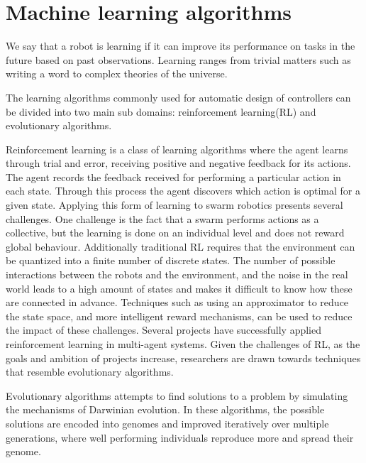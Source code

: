 \section{Machine learning algorithms}
\label{sec:learning}
We say that a robot is learning if it can improve its performance on tasks in the future based on past observations.
Learning ranges from trivial matters such as writing a word to complex theories of the universe.

The learning algorithms commonly used for automatic design of controllers can be divided into two main sub domains: reinforcement learning(RL) and evolutionary algorithms\cite{brambilla_swarm_2013}.

Reinforcement learning is a class of learning algorithms where the agent learns through trial and error, receiving positive and negative feedback for its actions\cite{brambilla_swarm_2013}.
The agent records the feedback received for performing a particular action in each state.
Through this process the agent discovers which action is optimal for a given state.
Applying this form of learning to swarm robotics presents several challenges.
One challenge is the fact that a swarm performs actions as a collective, but the learning is done on an individual level and does not reward global behaviour\cite{brambilla_swarm_2013}.
Additionally traditional RL requires that the environment can be quantized into a finite number of discrete states\cite{schmidhuber_evolutionary_2000}\cite{brambilla_swarm_2013}.
The number of possible interactions between the robots and the environment, and the noise in the real world leads to a high amount of states and makes it difficult to know how these are connected in advance\cite{schmidhuber_evolutionary_2000}.
Techniques such as using an approximator\cite{brambilla_swarm_2013} to reduce the state space, and more intelligent reward mechanisms\cite{brambilla_swarm_2013}, can be used to reduce the impact of these challenges.
Several projects\cite{li_learning_2004}\cite{balch_behavioral_1998}\cite{mataric_interaction_1994} have successfully applied reinforcement learning in multi-agent systems.
Given the challenges of RL, as the goals and ambition of projects increase, researchers are drawn towards techniques that resemble evolutionary algorithms\cite{schmidhuber_evolutionary_2000}.

Evolutionary algorithms attempts to find solutions to a problem by simulating the mechanisms of Darwinian evolution\cite{trianni_evolving_2004}.
In these algorithms, the possible solutions are encoded into genomes and improved iteratively over multiple generations, where well performing individuals reproduce more and spread their genome.



